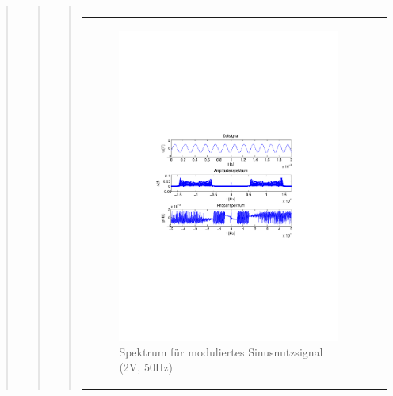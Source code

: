 \begin{quote}
\begin{quote}
\begin{quote}
\begin{center}
\begin{tabular}{ll}
            \end{tabular}
            \end{center}
        
        
               \begin{center}
            \begin{tabular}{ll}

            \hspace{-14em}
                \begin{minipage}{0.6\textwidth}

                    \begin{figure}[H]
                        \label{fig:}
                        \includegraphics[scale=0.5, trim = 2cm 6.5cm 1.5cm
                        8.5cm, clip]{./Bilder/sin_a2_f50}
                        \caption{Spektrum für moduliertes Sinusnutzsignal (2V,
                        50Hz)}
                    \end{figure}


\end{minipage}
\end{tabular}
\end{center}
\end{quote}
\end{quote}
\end{quote}
